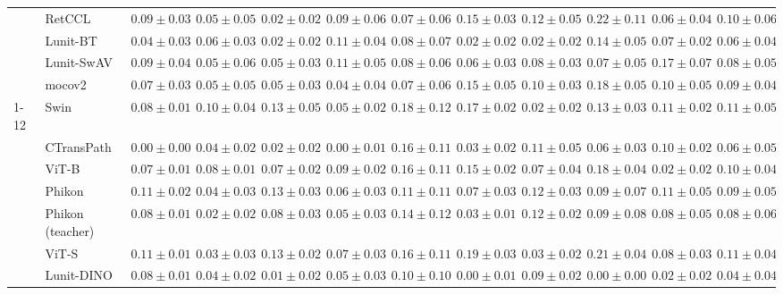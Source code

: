 \begin{tabular}{ll|cccc|c|cccc|c}
 & RetCCL & $0.09 \pm 0.03$ & $0.05 \pm 0.05$ & $0.02 \pm 0.02$ & $0.09 \pm 0.06$ & $0.07 \pm 0.06$ & $0.15 \pm 0.03$ & $0.12 \pm 0.05$ & $0.22 \pm 0.11$ & $0.06 \pm 0.04$ & $0.10 \pm 0.06$ \\
 & Lunit-BT & $0.04 \pm 0.03$ & $0.06 \pm 0.03$ & $\mathbf{0.02 \pm 0.02}$ & $0.11 \pm 0.04$ & $0.08 \pm 0.07$ & $0.02 \pm 0.02$ & $\mathbf{0.02 \pm 0.02}$ & $0.14 \pm 0.05$ & $0.07 \pm 0.02$ & $0.06 \pm 0.04$ \\
 & Lunit-SwAV & $0.09 \pm 0.04$ & $0.05 \pm 0.06$ & $0.05 \pm 0.03$ & $0.11 \pm 0.05$ & $0.08 \pm 0.06$ & $0.06 \pm 0.03$ & $0.08 \pm 0.03$ & $0.07 \pm 0.05$ & $0.17 \pm 0.07$ & $0.08 \pm 0.05$ \\
 & mocov2 & $0.07 \pm 0.03$ & $0.05 \pm 0.05$ & $0.05 \pm 0.03$ & $0.04 \pm 0.04$ & $0.07 \pm 0.06$ & $0.15 \pm 0.05$ & $0.10 \pm 0.03$ & $0.18 \pm 0.05$ & $0.10 \pm 0.05$ & $0.09 \pm 0.04$ \\
\cline{1-12}
\multirow[t]{12}{*}{Mean pool} & Swin & $0.08 \pm 0.01$ & $0.10 \pm 0.04$ & $0.13 \pm 0.05$ & $0.05 \pm 0.02$ & $0.18 \pm 0.12$ & $0.17 \pm 0.02$ & $\mathbf{0.02 \pm 0.02}$ & $0.13 \pm 0.03$ & $0.11 \pm 0.02$ & $0.11 \pm 0.05$ \\
 & CTransPath & $\mathbf{0.00 \pm 0.00}$ & $0.04 \pm 0.02$ & $0.02 \pm 0.02$ & $\mathbf{0.00 \pm 0.01}$ & $0.16 \pm 0.11$ & $0.03 \pm 0.02$ & $0.11 \pm 0.05$ & $0.06 \pm 0.03$ & $0.10 \pm 0.02$ & $0.06 \pm 0.05$ \\
 & ViT-B & $0.07 \pm 0.01$ & $0.08 \pm 0.01$ & $0.07 \pm 0.02$ & $0.09 \pm 0.02$ & $0.16 \pm 0.11$ & $0.15 \pm 0.02$ & $0.07 \pm 0.04$ & $0.18 \pm 0.04$ & $0.02 \pm 0.02$ & $0.10 \pm 0.04$ \\
 & Phikon & $0.11 \pm 0.02$ & $0.04 \pm 0.03$ & $0.13 \pm 0.03$ & $0.06 \pm 0.03$ & $0.11 \pm 0.11$ & $0.07 \pm 0.03$ & $0.12 \pm 0.03$ & $0.09 \pm 0.07$ & $0.11 \pm 0.05$ & $0.09 \pm 0.05$ \\
 & Phikon (teacher) & $0.08 \pm 0.01$ & $0.02 \pm 0.02$ & $0.08 \pm 0.03$ & $0.05 \pm 0.03$ & $0.14 \pm 0.12$ & $0.03 \pm 0.01$ & $0.12 \pm 0.02$ & $0.09 \pm 0.08$ & $0.08 \pm 0.05$ & $0.08 \pm 0.06$ \\
 & ViT-S & $0.11 \pm 0.01$ & $0.03 \pm 0.03$ & $0.13 \pm 0.02$ & $0.07 \pm 0.03$ & $0.16 \pm 0.11$ & $0.19 \pm 0.03$ & $0.03 \pm 0.02$ & $0.21 \pm 0.04$ & $0.08 \pm 0.03$ & $0.11 \pm 0.04$ \\
 & Lunit-DINO & $0.08 \pm 0.01$ & $0.04 \pm 0.02$ & $\mathbf{0.01 \pm 0.02}$ & $0.05 \pm 0.03$ & $\mathbf{0.10 \pm 0.10}$ & $\mathbf{0.00 \pm 0.01}$ & $0.09 \pm 0.02$ & $\mathbf{0.00 \pm 0.00}$ & $\mathbf{0.02 \pm 0.02}$ & $\mathbf{0.04 \pm 0.04}$ \\

\end{tabular}
